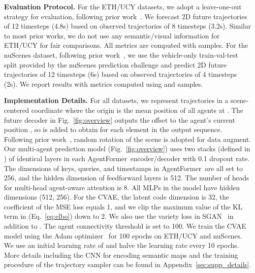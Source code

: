 \documentclass[10pt,twocolumn,letterpaper]{article}
\newcommand{\mname}{AgentFormer}
\begin{document}
\vspace{2mm}
\noindent\textbf{Evaluation Protocol.}
For the ETH/UCY datasets, we adopt a leave-one-out strategy for evaluation, following prior work~\cite{gupta2018social,sadeghian2019sophie,salzmann2020trajectron++,mangalam2020not,yu2020spatio}. We forecast 2D future trajectories of 12 timesteps (4.8s) based on observed trajectories of 8 timesteps (3.2s). Similar to most prior works, we do not use any semantic/visual information for ETH/UCY for fair comparisons. All metrics are computed with  samples. For the nuScenes dataset, following prior work~\cite{phan2020covernet,chai2020multipath,cui2019multimodal,ma2020diverse}, we use the vehicle-only train-val-test split provided by the nuScenes prediction challenge and predict 2D future trajectories of 12 timesteps (6s) based on observed trajectories of 4 timesteps (2s). We report results with metrics computed using  and  samples.

\vspace{2mm}
\noindent\textbf{Implementation Details.}
For all datasets, we represent trajectories in a scene-centered coordinate where the origin is the mean position of all agents at . The future decoder in Fig.~\ref{fig:overview} outputs the offset to the agent's current position , so  is added to obtain  for each element in the output sequence. Following prior work~\cite{salzmann2020trajectron++,yu2020spatio}, random rotation of the scene is adopted for data augment.
Our multi-agent prediction model (Fig.~\ref{fig:overview}) uses two stacks (defined in \cite{vaswani2017attention}) of identical layers in each \mname\ encoder/decoder with 0.1 dropout rate. The dimensions  of keys, queries, and timestamps in \mname\ are all set to 256, and the hidden dimension of feedforward layers is 512. The number of heads for multi-head agent-aware attention is 8. All MLPs in the model have hidden dimensions (512, 256). For the CVAE, the latent code dimension  is 32, the coefficient  of the MSE loss equals 1, and we clip the maximum value of the KL term in  (Eq.~\eqref{eq:elbo}) down to 2. We also use the variety loss in SGAN~\cite{gupta2018social} in addition to . The agent connectivity threshold  is set to 100. We train the CVAE model using the Adam optimizer~\cite{kingma2014adam} for 100 epochs on ETH/UCY and nuScenes. We use an initial learning rate of  and halve the learning rate every 10 epochs. More details including the CNN for encoding semantic maps and the training procedure of the trajectory sampler can be found in Appendix~\ref{sec:supp_details}.
\end{document}

